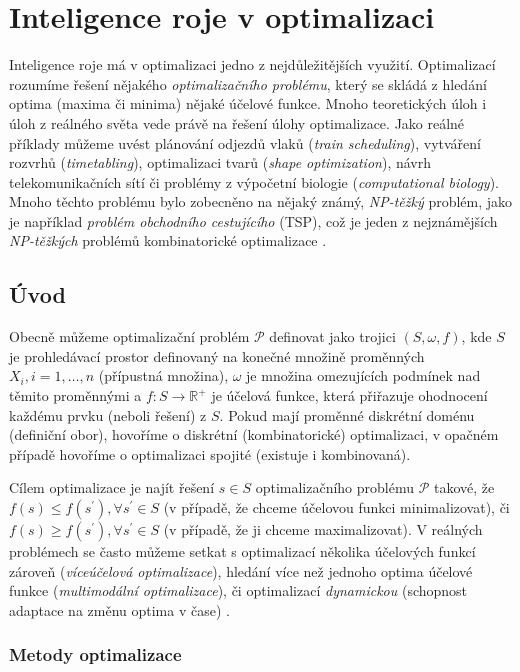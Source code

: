 \documentclass[a4paper,12pt]{article}
\begin{document}
\section{Inteligence roje v optimalizaci}
Inteligence roje má v optimalizaci jedno z nejdůležitějších využití. Optimalizací rozumíme řešení
nějakého {\it optimalizačního problému}, který se skládá z hledání optima (maxima či minima)
nějaké účelové funkce. Mnoho teoretických úloh i úloh z reálného světa vede právě na řešení úlohy
optimalizace. Jako reálné příklady můžeme uvést plánování odjezdů vlaků ({\it train scheduling}),
vytváření rozvrhů ({\it timetabling}), optimalizaci tvarů ({\it shape optimization}), návrh
telekomunikačních sítí či problémy z výpočetní biologie ({\it computational biology}). Mnoho
těchto problému bylo zobecněno na nějaký známý, {\it NP-těžký} problém, jako je například {\it problém
obchodního cestujícího} (TSP), což je jeden z nejznámějších {\it NP-těžkých} problémů kombinatorické
optimalizace \cite{Blum08SwarmOpt}.

\subsection{Úvod}

Obecně můžeme optimalizační problém $\mathcal{P}$ definovat jako trojici $(S,\omega,f)$, kde $S$
je prohledávací prostor definovaný na konečné množině proměnných $X_i,i=1,\dots,n$ (přípustná
množina), $\omega$ je množina omezujících podmínek nad těmito proměnnými a
$f:S\rightarrow\mathbb{R}^{+}$ je účelová funkce, která přiřazuje ohodnocení každému prvku (neboli
řešení) z $S$. Pokud mají proměnné diskrétní doménu (definiční obor), hovoříme o diskrétní
(kombinatorické) optimalizaci, v opačném případě hovoříme o optimalizaci spojité (existuje i
kombinovaná).

Cílem optimalizace je najít řešení $s\in S$ optimalizačního problému $\mathcal{P}$ takové, že
$f(s)\leq f(s^{\prime}),\forall s^{\prime}\in S$ (v případě, že chceme účelovou funkci
minimalizovat), či $f(s)\geq f(s^{\prime}),\forall s^{\prime}\in S$ (v případě, že ji chceme
maximalizovat). V reálných problémech se často můžeme setkat s optimalizací několika účelových
funkcí zároveň ({\it víceúčelová optimalizace}), hledání více než jednoho optima účelové funkce
({\it multimodální optimalizace}), či optimalizací {\it dynamickou} (schopnost adaptace na změnu
optima v čase) \cite{Blum08SwarmOpt}.

\subsubsection{Metody optimalizace}
\end{document}

